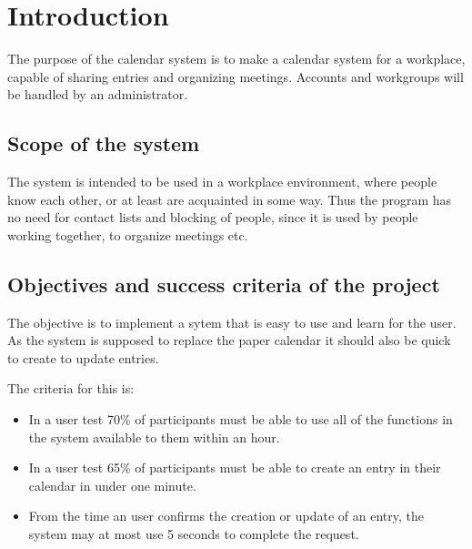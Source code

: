 \section{Introduction}
The purpose of the calendar system is to make a calendar system for a workplace, capable of sharing entries and organizing meetings. Accounts and workgroups will be handled by an administrator.
\subsection{Scope of the system}
The system is intended to be used in a workplace environment, where people know each other, or at least are acquainted in some way. Thus the program has no need for contact lists and blocking of people, since it is used by people working together, to organize meetings etc.
\subsection{Objectives and success criteria of the project}
The objective is to implement a sytem that is easy to use and learn for the user. As the system is supposed to replace the paper calendar it should also be quick to create to update entries.

The criteria for this is:
\begin{itemize}
\item In a user test 70\% of participants must be able to use all of the functions in the system available to them within an hour.
\item In a user test 65\% of participants must be able to create an entry in their calendar in under one minute.
\item From the time an user confirms the creation or update of an entry, the system may at most use 5 seconds to complete the request.
\end{itemize}